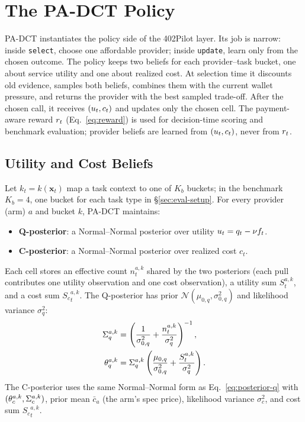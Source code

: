 \section{The PA-DCT Policy}
\label{sec:method}

PA-DCT instantiates the policy side of the 402Pilot layer. Its job is narrow: inside \texttt{select}, choose one affordable provider; inside \texttt{update}, learn only from the chosen outcome. The policy keeps two beliefs for each provider--task bucket, one about service utility and one about realized cost. At selection time it discounts old evidence, samples both beliefs, combines them with the current wallet pressure, and returns the provider with the best sampled trade-off. After the chosen call, it receives $(u_t,c_t)$ and updates only the chosen cell. The payment-aware reward $r_t$ (Eq.~\eqref{eq:reward}) is used for decision-time scoring and benchmark evaluation; provider beliefs are learned from $(u_t,c_t)$, never from $r_t$.

\subsection{Utility and Cost Beliefs}
\label{sec:method-posteriors}

Let $k_t=k(\mathbf{x}_t)$ map a task context to one of $K_b$ buckets; in the benchmark $K_b=4$, one bucket for each task type in \S\ref{sec:eval-setup}. For every provider (arm) $a$ and bucket $k$, PA-DCT maintains:
\begin{itemize}
\item \textbf{Q-posterior}: a Normal--Normal posterior over utility $u_t=q_t-\nu f_t$.
\item \textbf{C-posterior}: a Normal--Normal posterior over realized cost $c_t$.
\end{itemize}

Each cell stores an effective count $n^{a,k}_t$ shared by the two posteriors (each pull contributes one utility observation and one cost observation), a utility sum $S^{a,k}_t$, and a cost sum ${S_c}^{a,k}_t$. The Q-posterior has prior $\mathcal{N}(\mu_{0,q},\sigma^2_{0,q})$ and likelihood variance $\sigma^2_q$:
\begin{equation}
\label{eq:posterior-q}
\begin{aligned}
\Sigma_q^{a,k}
&= \left(\frac{1}{\sigma^2_{0,q}}
  + \frac{n^{a,k}_t}{\sigma^2_q}\right)^{-1},\\
\theta_q^{a,k}
&= \Sigma_q^{a,k}
  \left(\frac{\mu_{0,q}}{\sigma^2_{0,q}}
  + \frac{S^{a,k}_t}{\sigma^2_q}\right).
\end{aligned}
\end{equation}
The C-posterior uses the same Normal--Normal form as Eq.~\eqref{eq:posterior-q} with $(\theta_c^{a,k},\Sigma_c^{a,k})$, prior mean $\bar c_a$ (the arm's spec price), likelihood variance $\sigma^2_c$, and cost sum ${S_c}^{a,k}_t$.

